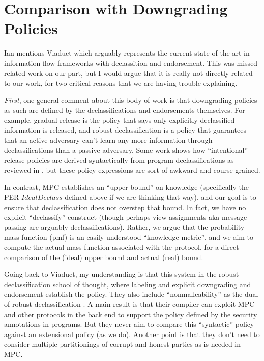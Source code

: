 \documentclass[acmsmall,screen,review]{acmart}
\begin{document}
\section{Comparison with Downgrading Policies}

Ian mentions Viaduct \cite{10.1145/3453483.3454074} which arguably
represents the current state-of-the-art in information flow frameworks
with declassition and endorsement. This was missed related work on our
part, but I would argue that it is really not directly related to our
work, for two critical reasons that we are having trouble explaining.

\emph{First}, one general comment about this body of work is that
downgrading policies as such are defined by the declassifications and
endorsements themselves. For example, gradual release \cite{4223226}
is the policy that says only explicitly declassified information is
released, and robust declassification \cite{930133} is a policy that
guarantees that an active adversary can't learn any more information
through declassifications than a passive adversary. Some work shows
how ``intentional'' release policies are derived syntactically from
program declassifications as reviewed in
\cite{10.5555/1662658.1662659}, but these policy expressions are sort
of awkward and course-grained.

In contrast, MPC establishes an ``upper bound'' on knowledge
(specifically the PER $\mathit{IdealDeclass}$ defined above if we are
thinking that way), and our goal is to ensure that declassification
does not overstep that bound. In fact, we have no explicit
``declassify'' construct (though perhaps view assignments aka message
passing are arguably declassifications). Rather, we argue that the
probability mass function (pmf) is an easily understood ``knowledge
metric'', and we aim to compute the actual mass function associated
with the protocol, for a direct comparison of the (ideal) upper bound
and actual (real) bound.

Going back to Viaduct, my understanding is that this system in the robust
declassification school of thought, where labeling and explicit
downgrading and endorsement establish the policy. They also include
``nonmalleability'' as the dual of robust declassification
\cite{10.1145/3133956.3134054}. A main result is that their compiler
can exploit MPC and other protocols in the back end to support the
policy defined by the security annotations in programs. But they never
aim to compare this ``syntactic'' policy against an extensional policy
(as we do). Another point is that they don't need to consider multiple
partitionings of corrupt and honest parties as is needed in MPC.
\end{document}
